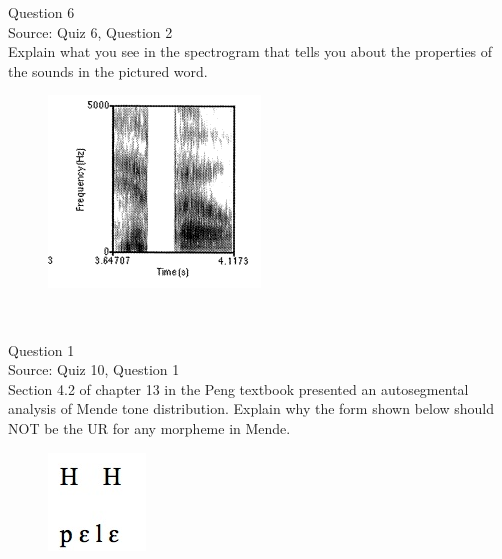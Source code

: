 \documentclass[12pt]{article}
\begin{document}
\newpage

{\large Question 6}\\

Source: Quiz 6, Question 2\\

Explain what you see in the spectrogram that tells you about the properties of the sounds in the pictured word.\\

\begin{figure}[H]
\includegraphics{../images/spectrogram_hippo.png}
\end{figure}

\newpage

\begin{center}
\textbf{{\color{red}{\HUGE END OF EXAM}}}\\

\end{center}
\newpage

\begin{center}
\textbf{{\color{blue}{\HUGE START OF EXAM\\}}}

\textbf{{\color{blue}{\HUGE Student ID: 5581\\}}}

\textbf{{\color{blue}{\HUGE 3:40 - 4:00 PM\\}}}

\end{center}
\newpage

{\large Question 1}\\

Source: Quiz 10, Question 1\\

Section 4.2 of chapter 13 in the Peng textbook presented an autosegmental analysis of Mende tone distribution. Explain why the form shown below should NOT be the UR for any morpheme in Mende.\\

\begin{figure}[H]
\includegraphics{../images/mende_house_b.png}
\end{figure}
\end{document}
